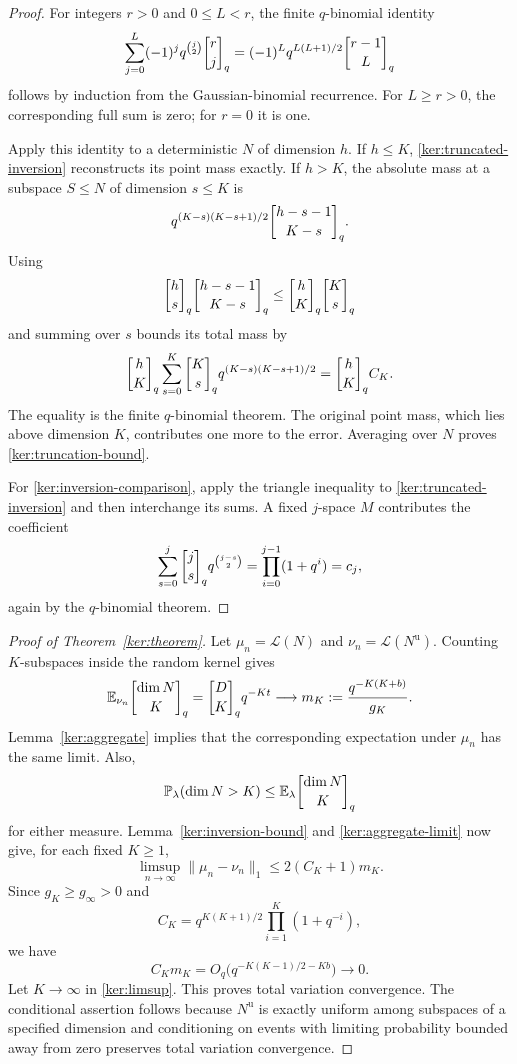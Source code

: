 \begin{proof}
For integers $r>0$ and $0\le L<r$, the finite $q$-binomial identity
\begin{equation}
 \sum_{j=0}^L(-1)^j q^{\binom j2}\qbinom rj
 =(-1)^Lq^{L(L+1)/2}\qbinom{r-1}{L}
 \label{ker:q-partial}
\end{equation}
follows by induction from the Gaussian-binomial recurrence.
For $L\ge r>0$, the corresponding full sum is zero; for $r=0$ it
is one.

Apply this identity to a deterministic $N$ of dimension $h$.  If
$h\le K$, \eqref{ker:truncated-inversion} reconstructs its point mass
exactly.  If $h>K$, the absolute mass at a subspace $S\le N$ of
dimension $s\le K$ is
\[
 q^{(K-s)(K-s+1)/2}\qbinom{h-s-1}{K-s}.
\]
Using
\[
 \qbinom hs\qbinom{h-s-1}{K-s}
 \le\qbinom hK\qbinom Ks
\]
and summing over $s$ bounds its total mass by
\[
 \qbinom hK
 \sum_{s=0}^K\qbinom Ks q^{(K-s)(K-s+1)/2}
 =\qbinom hK C_K.
\]
The equality is the finite $q$-binomial theorem.  The original point
mass, which lies above dimension $K$, contributes one more to the
error.  Averaging over $N$ proves \eqref{ker:truncation-bound}.

For \eqref{ker:inversion-comparison}, apply the triangle inequality
to \eqref{ker:truncated-inversion} and then interchange its sums.
A fixed $j$-space $M$ contributes the coefficient
\[
 \sum_{s=0}^j\qbinom js q^{\binom{j-s}{2}}
 =\prod_{i=0}^{j-1}(1+q^i)=c_j,
\]
again by the $q$-binomial theorem.
\end{proof}

\begin{proof}[Proof of Theorem~\ref{ker:theorem}]
Let $\mu_n=\mathcal L(N)$ and $\nu_n=\mathcal L(N^{\mathrm u})$.
Counting $K$-subspaces inside the random kernel gives
\[
 \E_{\nu_n}\qbinom{\dim N}{K}
 =\qbinom DK q^{-Kt}
 \longrightarrow
 m_K:=\frac{q^{-K(K+b)}}{g_K}.
\]
Lemma~\ref{ker:aggregate} implies that the corresponding expectation
under $\mu_n$ has the same limit.  Also,
\[
 \Pbb_\lambda(\dim N>K)
 \le\E_\lambda\qbinom{\dim N}{K}
\]
for either measure.  Lemma~\ref{ker:inversion-bound} and
\eqref{ker:aggregate-limit} now give, for each fixed $K\ge1$,
\begin{equation}
 \limsup_{n\to\infty}\|\mu_n-\nu_n\|_1
 \le2(C_K+1)m_K.
 \label{ker:limsup}
\end{equation}
Since $g_K\ge g_\infty>0$ and
\[
 C_K=q^{K(K+1)/2}\prod_{i=1}^K(1+q^{-i}),
\]
we have
\[
 C_Km_K
 =O_q\bigl(q^{-K(K-1)/2-Kb}\bigr)\longrightarrow0.
\]
Let $K\to\infty$ in \eqref{ker:limsup}.  This proves total variation
convergence.  The conditional assertion follows because $N^{\mathrm u}$
is exactly uniform among subspaces of a specified dimension and
conditioning on events with limiting probability bounded away from
zero preserves total variation convergence.
\end{proof}


